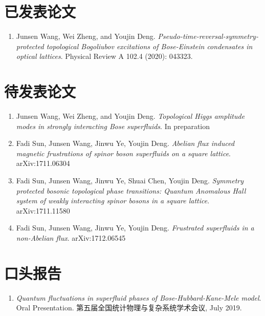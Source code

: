 
\begin{publications}

\section*{已发表论文}

\begin{enumerate}
\item Junsen Wang, Wei Zheng, and Youjin Deng. \emph{Pseudo-time-reversal-symmetry-protected topological Bogoliubov excitations of Bose-Einstein condensates in optical lattices}. Physical Review A 102.4 (2020): 043323.
\end{enumerate}

\section*{待发表论文}

\begin{enumerate}

\item Junsen Wang, Wei Zheng, and Youjin Deng. \emph{Topological Higgs amplitude modes in strongly interacting Bose superfluids}. In preparation
\item Fadi Sun, Junsen Wang, Jinwu Ye, Youjin Deng. \emph{Abelian flux induced magnetic frustrations of spinor boson superfluids on a square lattice}. arXiv:1711.06304
\item Fadi Sun, Junsen Wang, Jinwu Ye, Shuai Chen, Youjin Deng. \emph{Symmetry protected bosonic topological phase transitions: Quantum Anomalous Hall system of weakly interacting spinor bosons in a square lattice}. arXiv:1711.11580
\item Fadi Sun, Junsen Wang, Jinwu Ye, Youjin Deng. \emph{Frustrated superfluids in a non-Abelian flux}. arXiv:1712.06545
\end{enumerate}

\section*{口头报告}
\begin{enumerate}
\item \emph{Quantum fluctuations in superfluid phases of Bose-Hubbard-Kane-Mele model}. Oral Presentation. 第五届全国统计物理与复杂系统学术会议, July 2019.
\end{enumerate}

\end{publications}
